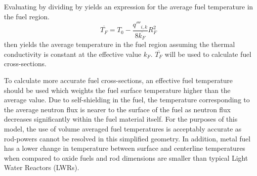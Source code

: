       Evaluating  by dividing  by
       yields an expression for the average fuel
      temperature in the fuel region.
      \begin{equation}
        \label{eq:tf_bar}
        \overline{T_F} = T_0 - \frac{q'''_{i,k}}{8 \overline{k_F}} R_F^2
      \end{equation}
       then yields the average temperature in the fuel region
      assuming the thermal conductivity is constant at the effective value
      $k_F$. $\overline{T_F}$ will be used to calculate fuel cross-sections. 

      To calculate more accurate fuel cross-sections, an effective fuel 
      temperature should be used which weights the fuel surface temperature 
      higher than the average value.  Due to self-shielding in the fuel, the 
      temperature corresponding to the average neutron flux is nearer to the 
      surface of the fuel as neutron flux decreases significantly within the 
      fuel material itself. For the purposes of this model, the use of volume 
      averaged fuel temperatures is acceptably accurate as rod-powers cannot be 
      resolved in this simplified geometry. In addition, metal fuel has a lower 
      change in temperature between surface and centerline temperatures when 
      compared to oxide fuels and rod dimensions are smaller than typical Light 
      Water Reactors (LWRs).

